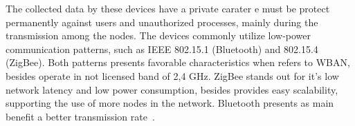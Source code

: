 The collected data by these devices have a private carater  e must be protect permanently against users and unauthorized processes, mainly during the transmission among the nodes. The devices commonly utilize low-power communication patterns, such as IEEE 802.15.1 (Bluetooth) and 802.15.4 (ZigBee). Both patterns presents favorable characteristics when refers to WBAN, besides operate in not licensed band of 2,4 GHz. ZigBee stands out for it’s low network latency and low power consumption, besides provides easy scalability, supporting the use of more nodes in the network. Bluetooth presents as main benefit a better transmission rate~\cite{baker2005zigbee}.